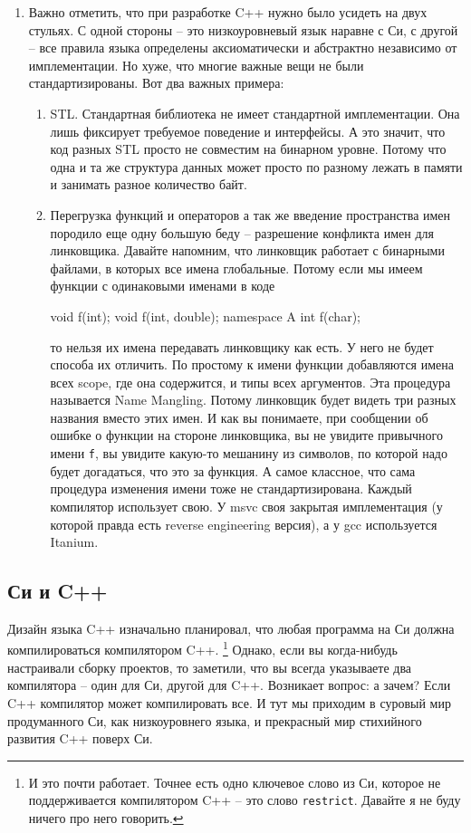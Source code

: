 \begin{enumerate}
\item %
Важно отметить, что при разработке C++ нужно было усидеть на двух стульях.
С одной стороны -- это низкоуровневый язык наравне с Си, с другой -- все правила языка определены аксиоматически и абстрактно независимо от имплементации.
Но хуже, что многие важные вещи не были стандартизированы.
Вот два важных примера:
\begin{enumerate}
\item STL.
Стандартная библиотека не имеет стандартной имплементации.
Она лишь фиксирует требуемое поведение и интерфейсы.
А это значит, что код разных STL просто не совместим на бинарном уровне.
Потому что одна и та же структура данных может просто по разному лежать в памяти и занимать разное количество байт.

\item Перегрузка функций и операторов а так же введение пространства имен породило еще одну большую беду -- разрешение конфликта имен для линковщика.
Давайте напомним, что линковщик работает с бинарными файлами, в которых все имена глобальные.
Потому если мы имеем функции с одинаковыми именами в коде
\begin{cppcode}
void f(int);
void f(int, double);
namespace A {
int f(char);
}
\end{cppcode}
то нельзя их имена передавать линковщику как есть.
У него не будет способа их отличить.
По простому к имени функции добавляются имена всех scope, где она содержится, и типы всех аргументов.
Эта процедура называется Name Mangling.
Потому линковщик будет видеть три разных названия вместо этих имен.
И как вы понимаете, при сообщении об ошибке о функции на стороне линковщика, вы не увидите привычного имени \verb"f", вы увидите какую-то мешанину из символов, по которой надо будет догадаться, что это за функция.
А самое классное, что сама процедура изменения имени тоже не стандартизирована.
Каждый компилятор использует свою.
У msvc своя закрытая имплементация (у которой правда есть reverse engineering версия), а у gcc используется Itanium.
\end{enumerate}
\end{enumerate}

\subsection{Си и C++}

Дизайн языка C++ изначально планировал, что любая программа на Си должна компилироваться компилятором C++.%
\footnote{И это почти работает.
Точнее есть одно ключевое слово из Си, которое не поддерживается компилятором C++ -- это слово \texttt{restrict}.
Давайте я не буду ничего про него говорить.}
Однако, если вы когда-нибудь настраивали сборку проектов, то заметили, что вы всегда указываете два компилятора -- один для Си, другой для C++.
Возникает вопрос: а зачем?
Если C++ компилятор может компилировать все.
И тут мы приходим в суровый мир продуманного Си, как низкоуровнего языка, и прекрасный мир стихийного развития C++ поверх Си.

